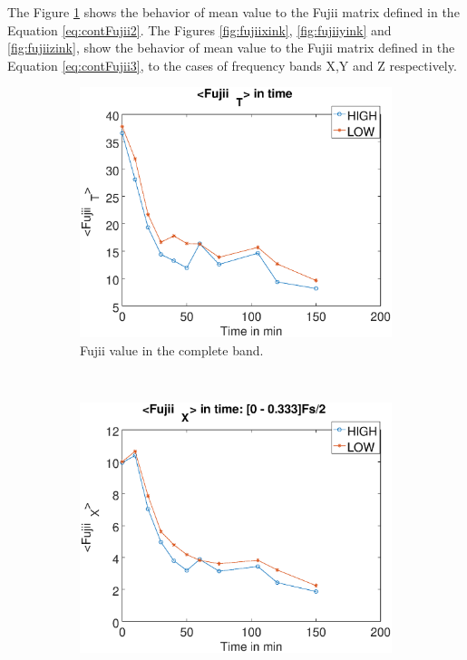 \documentclass[review]{elsarticle}
\begin{document}
The Figure \ref{fig:fujiiallink} shows the behavior of mean value to the Fujii matrix
defined in the Equation \ref{eq:contFujii2}.
The Figures \ref{fig:fujiixink}, \ref{fig:fujiiyink} and \ref{fig:fujiizink},
show the behavior of mean value to the Fujii matrix defined in the Equation \ref{eq:contFujii3},
to the cases of frequency bands X,Y and Z respectively. 
\begin{figure}[!h]
    \centering
    \begin{subfigure}[b]{0.475\textwidth}
        \includegraphics[width=\textwidth]{fujii-all.eps}
	\caption{Fujii value in the complete band.}
        \label{fig:fujiiallink}
    \end{subfigure}
    ~
    \begin{subfigure}[b]{0.475\textwidth}
        \includegraphics[width=\textwidth]{fujii-bandx.eps}

\end{subfigure}
\end{figure}
\end{document}
